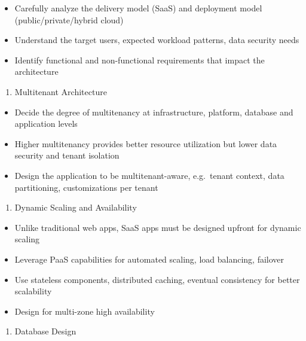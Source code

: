 \documentclass[10pt, landscape]{article}
\begin{document}
\begin{multicols*}{4}
\begin{itemize}
\tightlist
\item
  Carefully analyze the delivery model (SaaS) and deployment model
  (public/private/hybrid cloud)
\item
  Understand the target users, expected workload patterns, data security
  needs
\item
  Identify functional and non-functional requirements that impact the
  architecture
\end{itemize}

\begin{enumerate}
\def\labelenumi{\arabic{enumi}.}
\setcounter{enumi}{1}
\tightlist
\item
  Multitenant Architecture
\end{enumerate}

\begin{itemize}
\tightlist
\item
  Decide the degree of multitenancy at infrastructure, platform,
  database and application levels
\item
  Higher multitenancy provides better resource utilization but lower
  data security and tenant isolation
\item
  Design the application to be multitenant-aware, e.g.~tenant context,
  data partitioning, customizations per tenant
\end{itemize}

\begin{enumerate}
\def\labelenumi{\arabic{enumi}.}
\setcounter{enumi}{2}
\tightlist
\item
  Dynamic Scaling and Availability
\end{enumerate}

\begin{itemize}
\tightlist
\item
  Unlike traditional web apps, SaaS apps must be designed upfront for
  dynamic scaling
\item
  Leverage PaaS capabilities for automated scaling, load balancing,
  failover
\item
  Use stateless components, distributed caching, eventual consistency
  for better scalability
\item
  Design for multi-zone high availability
\end{itemize}

\begin{enumerate}
\def\labelenumi{\arabic{enumi}.}
\setcounter{enumi}{3}
\tightlist
\item
  Database Design
\end{enumerate}


\end{multicols*}
\end{document}

